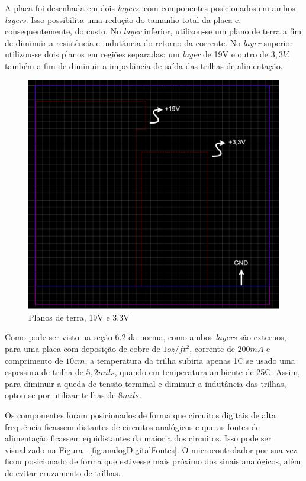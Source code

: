 \documentclass[
	12pt,				%
	openright,			%
	twoside,			%
	a4paper,			%
	english,			%
	french,				%
	spanish,			%
	brazil,				%
	]{abntex2}
\begin{document}
			A placa foi desenhada em dois \textit{layers}, com componentes
			posicionados em ambos \textit{layers}. Isso possibilita uma redução
			do tamanho total da placa e, consequentemente, do custo. No
			\textit{layer} inferior, utilizou-se um plano de terra a fim de
			diminuir a resistência e indutância do retorno da corrente.
			No \textit{layer} superior utilizou-se dois planos em regiões
			separadas: um \textit{layer} de 19V e outro de $3,3V$, também a fim de
			diminuir a impedância de saída das trilhas de alimentação.

			\begin{figure}[ht]
				\centering
				\includegraphics[scale=0.3]{../Fotos/pcbLayers.png}
				\caption{Planos de terra, 19V e 3,3V}
			\end{figure}

			Como pode ser visto na seção 6.2 da norma, como ambos \textit{layers} são
			externos, para uma placa com deposição de cobre de $1oz/ft^2$,
			corrente de $200mA$ e comprimento de $10cm$, a temperatura da
			trilha subiria apenas 1\textdegree C se usado uma espessura de
			trilha de $5,2 mils$, quando em temperatura ambiente de
			25\textdegree C. Assim, para diminuir a queda de tensão terminal e diminuir a indutância das trilhas, optou-se por utilizar trilhas de $8 mils$.

			Os componentes foram posicionados de forma que circuitos
			digitais de alta frequência ficassem distantes de circuitos
			analógicos e que as fontes de alimentação ficassem equidistantes
			da maioria dos circuitos. Isso pode ser visualizado na Figura
			~\ref{fig:analogDigitalFontes}. O microcontrolador por sua vez ficou posicionado de forma
			que estivesse mais próximo dos sinais analógicos, além de evitar
			cruzamento de trilhas.
\end{document}

